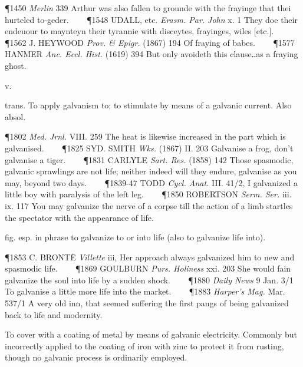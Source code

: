 \begin{description}[wide, labelwidth=!, labelindent=0pt]
\begin{myenumerate}
\P 1450  \textit{Merlin} 339 Arthur was also fallen to grounde with the frayinge that thei hurteled to-geder.    
\P 1548 UDALL, etc. \textit{Erasm. Par. John} x. 1 They doe their endeuour to maynteyn their tyrannie with disceytes, frayinges, wiles [etc.].    
\P 1562 J. HEYWOOD  \textit{Prov. \& Epigr.} (1867) 194 Of fraying of babes.    
\P 1577 HANMER  \textit{Anc. Eccl. Hist.} (1619) 394 But only avoideth this clause‥as a fraying ghost.
\end{myenumerate}


 v.

\noindent {}

\vspace{-0.3cm}

\begin{myenumerate}

 trans. To apply galvanism to; to stimulate by means of a galvanic current. Also absol.

\P 1802  \textit{Med. Jrnl.} VIII. 259 The heat is likewise increased in the part which is galvanised.    
\P 1825 SYD. SMITH  \textit{Wks.} (1867) II. 203 Galvanise a frog, don't galvanise a tiger.    
\P 1831 CARLYLE  \textit{Sart. Res.} (1858) 142 Those spasmodic, galvanic sprawlings are not life; neither indeed will they endure, galvanise as you may, beyond two days.    
\P 1839-47 TODD  \textit{Cycl. Anat.} III. 41/2, I galvanized a little boy with paralysis of the left leg.    
\P 1850 ROBERTSON  \textit{Serm. Ser.} iii. ix. 117 You may galvanize the nerve of a corpse till the action of a limb startles the spectator with the appearance of life.

 fig. esp. in phrase to galvanize to or into life (also to galvanize life into).

\P 1853 C. BRONTË  \textit{Villette} iii, Her approach always galvanized him to new and spasmodic life.    
\P 1869 GOULBURN  \textit{Purs. Holiness} xxi. 203 She would fain galvanize the soul into life by a sudden shock.    
\P 1880  \textit{Daily News} 9 Jan. 3/1 To galvanise a little more life into the market.    
\P 1883  \textit{Harper's Mag.} Mar. 537/1 A very old inn, that seemed suffering the first pangs of being galvanized back to life and modernity.

 To cover with a coating of metal by means of galvanic electricity. Commonly but incorrectly applied to the coating of iron with zinc to protect it from rusting, though no galvanic process is ordinarily employed.


\end{myenumerate}
\end{description}
